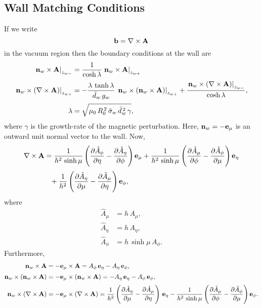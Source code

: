 \documentclass[12pt,prb,aps,notitlepage]{revtex4-1}
\begin{document}
\subsection{Wall Matching Conditions}
If we write
\begin{equation}
{\bf b} = \nabla\times{\bf A}
\end{equation}
in the vacuum region then the boundary conditions at the wall are 
\begin{align}
\left.{\bf n}_w\times {\bf A}\right|_{z_{w-}} &= \frac{1}{\cosh\lambda}\left.{\bf n}_w\times {\bf A}\right|_{z_{w+}} \\[0.5ex]
\left.{\bf n}_w\times (\nabla\times{\bf A})\right|_{z_{w+}}&= -\frac{\lambda\,\tanh\lambda}{\bar{d}_w\,g_w}\,\left.{\bf n}_w\times({\bf n}_w\times{\bf A})\right|_{z_{w+}}+
\frac{\left.{\bf n}_w\times (\nabla\times{\bf A})\right|_{z_{w-}}}{\cosh\lambda},\\[0.5ex]
\lambda &=\sqrt{\mu_0\,R_0^{\,2}\,\bar{\sigma}_w\,\bar{d}_w^{\,2}\,\gamma},
\end{align}
where $\gamma$ is the growth-rate of the magnetic perturbation. Here, ${\bf n}_w= -{\bf e}_\mu$ is an outward unit normal vector to the wall. Now,
\begin{align}
\nabla\times{\bf A} &= \frac{1}{h^2\,\sinh\mu}\left(\frac{\partial \hat{A}_\phi}{\partial \eta}-\frac{\partial\hat{A}_\eta}{\partial\phi}\right){\bf e}_\mu
+  \frac{1}{h^2\,\sinh\mu}\left(\frac{\partial \hat{A}_\mu}{\partial \phi}-\frac{\partial\hat{A}_\phi}{\partial\mu}\right){\bf e}_\eta\nonumber\\[0.5ex]
&\phantom{=}
+\frac{1}{h^2}\left(\frac{\partial \hat{A}_\eta}{\partial \mu}-\frac{\partial\hat{A}_\mu}{\partial\eta}\right){\bf e}_\phi,
\end{align}
where
\begin{align}
\hat{A}_\mu &= h\,A_\mu,\\[0.5ex]
\hat{A}_\eta&= h\,A_\eta,\\[0.5ex]
\hat{A}_\phi &= h\,\sinh\mu\,A_\phi.
\end{align}
Furthermore,
\begin{align}
{\bf n}_w\times {\bf A} &= -{\bf e}_\mu\times {\bf A} = A_\phi\,{\bf e}_\eta - A_\eta\,{\bf e}_\phi,\\[0.5ex]
{\bf n}_w\times ({\bf n}_w\times {\bf A})&= -{\bf e}_\mu\times ({\bf n}_w\times {\bf A} )= -A_\eta\,{\bf e}_\eta-A_\phi\,{\bf e}_\phi,\\[0.5ex]
{\bf n}_w\times (\nabla\times {\bf A}) &= -{\bf e}_\mu\times(\nabla\times {\bf A}) = \frac{1}{h^2}\left(\frac{\partial \hat{A}_\eta}{\partial \mu}-\frac{\partial\hat{A}_\mu}{\partial\eta}\right)\,{\bf e}_\eta- \frac{1}{h^2\,\sinh\mu}\left(\frac{\partial \hat{A}_\mu}{\partial \phi}-\frac{\partial\hat{A}_\phi}{\partial\mu}\right){\bf e}_\phi.
\end{align}
\end{document}
